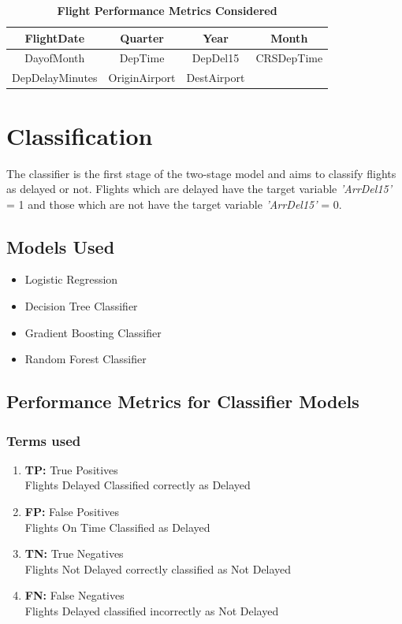 \documentclass[12pt]{extarticle}
\begin{document}
\vfill
{\renewcommand{\arraystretch}{1.5}%
\begin{table}[h]
    \centering
    \begin{tabular}{|c|c|c|c|}
        \hline
             FlightDate & Quarter & Year & Month\\
        \hline
            DayofMonth & DepTime & DepDel15 & CRSDepTime\\
        \hline
            DepDelayMinutes & OriginAirport & DestAirport &  \\
        \hline
    \end{tabular}
    \caption{\textbf{Flight Performance Metrics Considered}}
    \label{table:3}
\end{table}
}
\vfill
\newpage

\section{Classification}
The classifier is the first stage of the two-stage model and aims to classify flights as delayed or not. Flights which are delayed have the target variable {\em 'ArrDel15'} = 1 and those which are not have the target variable {\em 'ArrDel15'} = 0. 

\subsection*{Models Used}
\begin{itemize}
    \item Logistic Regression
    \item Decision Tree Classifier
    \item Gradient Boosting Classifier
    \item Random Forest Classifier
\end{itemize}


\subsection*{Performance Metrics for Classifier Models} 
\subsubsection*{Terms used}
\begin{enumerate}
    \item \textbf{TP:} True Positives\\
    Flights Delayed Classified correctly as Delayed
    \item \textbf{FP:} False Positives\\
    Flights On Time Classified as Delayed
    \item \textbf{TN:} True Negatives\\
    Flights Not Delayed correctly classified as Not Delayed
    \item \textbf{FN:} False Negatives\\
    Flights Delayed classified incorrectly as Not Delayed
\end{enumerate}
\end{document}
